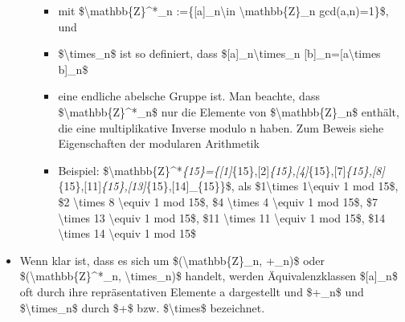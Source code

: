 \documentclass[a4paper]{article}
\begin{document}
\begin{multicols}{3}
\begin{itemize}
\begin{itemize}
                        \begin{itemize}
                            \item
                                  mit \$\textbackslash mathbb\{Z\}\^{}*\_n
                                  :=\{{[}a{]}\_n\textbackslash in \textbackslash mathbb\{Z\}\_n
                                  \textbar{} gcd(a,n)=1\}\$, und
                            \item
                                  \$\textbackslash times\_n\$ ist so definiert, dass
                                  \${[}a{]}\_n\textbackslash times\_n
                                  {[}b{]}\_n={[}a\textbackslash times b{]}\_n\$
                            \item
                                  eine endliche abelsche Gruppe ist. Man beachte, dass
                                  \$\textbackslash mathbb\{Z\}\^{}*\_n\$ nur die Elemente von
                                  \$\textbackslash mathbb\{Z\}\_n\$ enthält, die eine multiplikative
                                  Inverse modulo n haben. Zum Beweis siehe Eigenschaften der
                                  modularen Arithmetik
                            \item
                                  Beispiel:
                                  \$\textbackslash mathbb\{Z\}\^{}*\emph{\{15\}=\{{[}1{]}}\{15\},{[}2{]}\emph{\{15\},{[}4{]}}\{15\},{[}7{]}\emph{\{15\},{[}8{]}}\{15\},{[}11{]}\emph{\{15\},{[}13{]}}\{15\},{[}14{]}\_\{15\}\}\$,
                                  als \$1\textbackslash times 1\textbackslash equiv 1 mod 15\$, \$2
                                  \textbackslash times 8 \textbackslash equiv 1 mod 15\$, \$4
                                  \textbackslash times 4 \textbackslash equiv 1 mod 15\$, \$7
                                  \textbackslash times 13 \textbackslash equiv 1 mod 15\$, \$11
                                  \textbackslash times 11 \textbackslash equiv 1 mod 15\$, \$14
                                  \textbackslash times 14 \textbackslash equiv 1 mod 15\$
                        \end{itemize}
              \end{itemize}
        \item
              Wenn klar ist, dass es sich um \$(\textbackslash mathbb\{Z\}\_n,
              +\_n)\$ oder \$(\textbackslash mathbb\{Z\}\^{}*\_n,
              \textbackslash times\_n)\$ handelt, werden Äquivalenzklassen
              \${[}a{]}\_n\$ oft durch ihre repräsentativen Elemente a dargestellt
              und \$+\_n\$ und \$\textbackslash times\_n\$ durch \$+\$ bzw.
              \$\textbackslash times\$ bezeichnet.


\end{itemize}
\end{multicols}
\end{document}
